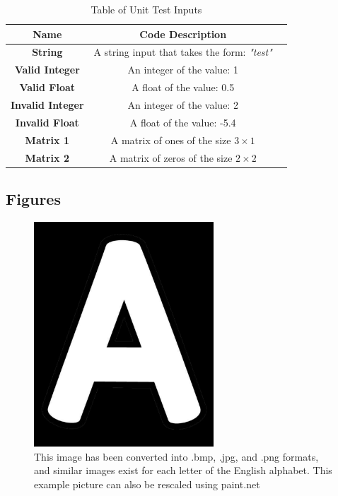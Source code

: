 \documentclass[12pt, titlepage]{article}
\begin{document}
\begin{table}[h!]
  \centering
  \begin{tabular}{|c|c|c|}
    \hline
    \textbf{Name} & \textbf{Code Description} \\ \hline
    \textbf{String} & A string input that takes the form: \textit{"test"} \\ \hline
    \textbf{Valid Integer} & An integer of the value: 1 \\ \hline
    \textbf{Valid Float} & A float of the value: 0.5 \\ \hline
    \textbf{Invalid Integer} & An integer of the value: 2 \\ \hline
    \textbf{Invalid Float} & A float of the value: -5.4 \\ \hline
    \textbf{Matrix 1} & A matrix of ones of the size $3 \times 1$ \\ \hline
    \textbf{Matrix 2} & A matrix of zeros of the size $2 \times 2$ \\ \hline
    
  \end{tabular}
  \caption{Table of Unit Test Inputs}
  \label{table_unittest}
\end{table}

\subsection{Figures}

\begin{figure}[h!]
  \begin{center}
   \includegraphics[width=0.6\textwidth]{A}
  \caption{This image has been converted into .bmp, .jpg, and .png formats,
  and similar images exist for each letter of the English alphabet. This example picture can also be rescaled using paint.net}
  \label{Fig_A} 
  \end{center}
  \end{figure}
\end{document}
